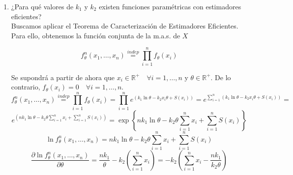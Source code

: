 \documentclass[12pt]{article}
\newcommand{\E}{\mathrm{E}}
\newcommand{\R}{\mathbb{R}}
\newcommand{\Rmas}{\R^{+}}
\begin{document}
\begin{ejercicio}[2 puntos]
\begin{enumerate}[label=\alph*)]
            y sustituyendo y usando $\E_\theta[X]$ obtenida en el apartado anterior:

            $$\text{Cov}_\theta(U(X),X) = - \dfrac{2}{k_2\theta} + \dfrac{k_1}{k_2 \theta} \E_\theta [U(X)] - \E_\theta[U(X)] \dfrac{k_1}{k_2 \theta} = - \dfrac{2}{k_2\theta} $$

            \item ¿Para qué valores de $k_1$ y $k_2$ existen funciones paramétricas con estimadores eficientes? \\
            
            Buscamos aplicar el Teorema de Caracterización de Estimadores Eficientes. Para ello, obtenemos la función conjunta de la m.a.s. de $X$

            $$f_\theta^n(x_1, \ldots, x_n) \stackrel{indep}{=} \prod_{i=1}^n f_\theta(x_i)$$

            Se supondrá a partir de ahora que $x_i \in \Rmas \quad \forall i=1,\ldots,n$ y $\theta \in \Rmas$. De lo contrario, $f_\theta(x_i) = 0 \quad \forall i = 1, \ldots, n$.
            $$f_\theta^n(x_1, \ldots, x_n) \stackrel{indep}{=} \prod_{i=1}^n f_\theta(x_i) = \prod_{i=1}^n 
            e^{\left(k_1 \ln\theta - k_2 x_i \theta + S(x_i)\right)} = e^{\sum_{i=1}^{n} \left(k_1 \ln\theta - k_2 x_i \theta + S(x_i)\right)} = $$ 
            $$e^{\left(n k_1 \ln\theta- k_2 \theta \sum_{i=1}^{n} x_i + \sum_{i=1}^{n}S(x_i)\right)} = \exp \left\{n k_1 \ln\theta- k_2 \theta \sum_{i=1}^{n} x_i + \sum_{i=1}^{n}S(x_i)\right\}$$
            $$\ln f_\theta^n(x_1, \ldots, x_n) = n k_1 \ln\theta- k_2 \theta \sum_{i=1}^{n} x_i + \sum_{i=1}^{n}S(x_i)$$
            $$\dfrac{\partial \ln f_\theta^n(x_1, \ldots, x_n)}{\partial \theta} = \dfrac{n k_1}{\theta} - k_2 \left( \sum_{i=1}^{n} x_i \right) = - k_2 \left(\sum_{i=1}^{n} x_i - \dfrac{n k_1}{k_2\theta} \right) $$


\end{enumerate}
\end{ejercicio}
\end{document}
